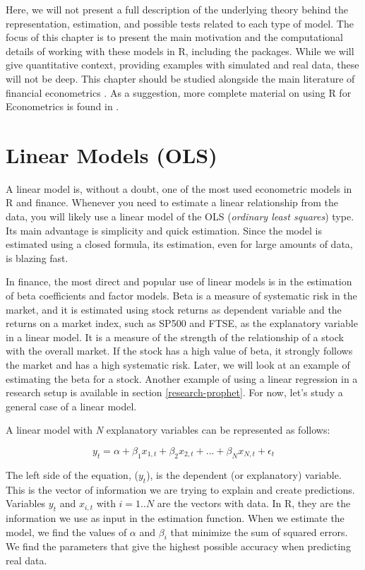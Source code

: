 \documentclass[11pt,]{book}
\begin{document}
Here, we will not present a full description of the underlying theory
behind the representation, estimation, and possible tests related to
each type of model. The focus of this chapter is to present the main
motivation and the computational details of working with these models in
R, including the packages. While we will give quantitative context,
providing examples with simulated and real data, these will not be deep.
This chapter should be studied alongside the main literature of
financial econometrics \citep[\citet{brooks2014introductory},
\citet{hamilton1994time},
\citet{greene2003econometric}]{campbell1997econometrics}. As a
suggestion, more complete material on using R for Econometrics is found
in \citet{kleiber2008applied}.

\section{Linear Models (OLS)}\label{linear-models-ols}

A linear model is, without a doubt, one of the most used econometric
models in R and finance. Whenever you need to estimate a linear
relationship from the data, you will likely use a linear model of the
OLS (\emph{ordinary least squares}) type. Its main advantage is
simplicity and quick estimation. Since the model is estimated using a
closed formula, its estimation, even for large amounts of data, is
blazing fast.

In finance, the most direct and popular use of linear models is in the
estimation of beta coefficients and factor models. Beta is a measure of
systematic risk in the market, and it is estimated using stock returns
as dependent variable and the returns on a market index, such as SP500
and FTSE, as the explanatory variable in a linear model. It is a measure
of the strength of the relationship of a stock with the overall market.
If the stock has a high value of beta, it strongly follows the market
and has a high systematic risk. Later, we will look at an example of
estimating the beta for a stock. Another example of using a linear
regression in a research setup is available in section
\ref{research-prophet}. For now, let's study a general case of a linear
model.

A linear model with \emph{N} explanatory variables can be represented as
follows:

\[y _t = \alpha + \beta _1 x_{1,t} + \beta _2 x_{2,t} + ... + \beta _N x_{N,t} + \epsilon _t\]

The left side of the equation, (\(y_t\)), is the dependent (or
explanatory) variable. This is the vector of information we are trying
to explain and create predictions. Variables \(y_t\) and \(x_{i,t}\)
with \(i=1..N\) are the vectors with data. In R, they are the
information we use as input in the estimation function. When we estimate
the model, we find the values of \(\alpha\) and \(\beta _i\) that
minimize the sum of squared errors. We find the parameters that give the
highest possible accuracy when predicting real data.
\end{document}
